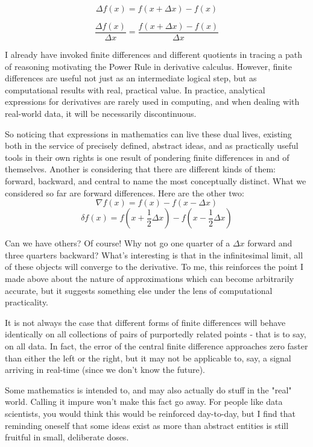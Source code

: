 \documentclass[a4paper]{article}
\begin{document}
$$ \Delta f(x) = f\left(x+\Delta x\right) - f(x) $$

$$ \frac{\Delta f(x)}{\Delta x} = \frac{f\left(x+\Delta x\right) - f(x)}{\Delta x} $$

I already have invoked finite differences and different quotients in tracing a path of reasoning motivating the Power Rule in derivative calculus. However, finite differences are useful not just as an intermediate logical step, but as computational results with real, practical value. In practice, analytical expressions for derivatives are rarely used in computing, and when dealing with real-world data, it will be necessarily discontinuous.

So noticing that expressions in mathematics can live these dual lives, existing both in the service of precisely defined, abstract ideas, and as practically useful tools in their own rights is one result of pondering finite differences in and of themselves. Another is considering that there are different kinds of them: forward, backward, and central to name the most conceptually distinct. What we considered so far are forward differences. Here are the other two:
$$ \nabla f(x) = f(x) - f\left(x - \Delta x\right) $$
$$ \delta f(x) = f\left(x+\frac{1}{2}\Delta x\right) - f\left(x - \frac{1}{2}\Delta x\right) $$

Can we have others? Of course! Why not go one quarter of a $\Delta x$ forward and three quarters backward? What's interesting is that in the infinitesimal limit, all of these objects will converge to the derivative. To me, this reinforces the point I made above about the nature of approximations which can become arbitrarily accurate, but it suggests something else under the lens of computational practicality. 

It is not always the case that different forms of finite differences will behave identically on all collections of pairs of purportedly related points - that is to say, on all data. In fact, the error of the central finite difference approaches zero faster than either the left or the right, but it may not be applicable to, say, a signal arriving in real-time (since we don't know the future). 

Some mathematics is intended to, and may also actually do stuff in the "real" world. Calling it impure won't make this fact go away. For people like data scientists, you would think this would be reinforced day-to-day, but I find that reminding oneself that some ideas exist as more than abstract entities is still fruitful in small, deliberate doses.
\end{document}
